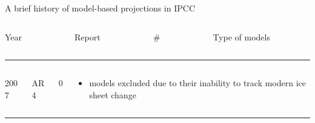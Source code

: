 \documentclass[hide notes,intlimits]{beamer}
\begin{document}
\begin{frame}{A brief history of model-based projections in IPCC}
  \begin{columns}[c]
    \begin{column}{.1\linewidth}
      Year
    \end{column}
    \begin{column}{.1\linewidth}
      Report
    \end{column}
    \begin{column}{.12\linewidth}
      \# 
    \end{column}
    \begin{column}{.60\linewidth}
      Type of models
    \end{column}
  \end{columns}
  \vspace{0.25em}
  \hrule

  \begin{columns}[c]
    \begin{column}{.1\linewidth}
      2007
    \end{column}
    \begin{column}{.1\linewidth}
      AR4
    \end{column}
    \begin{column}{.12\linewidth}
      0
    \end{column}
    \begin{column}{.6\linewidth}
      \begin{itemize}
      \item models excluded due to their inability to track modern ice sheet change
      \end{itemize}
    \end{column}
  \end{columns}
  \hrule

\end{frame}
\end{document}
